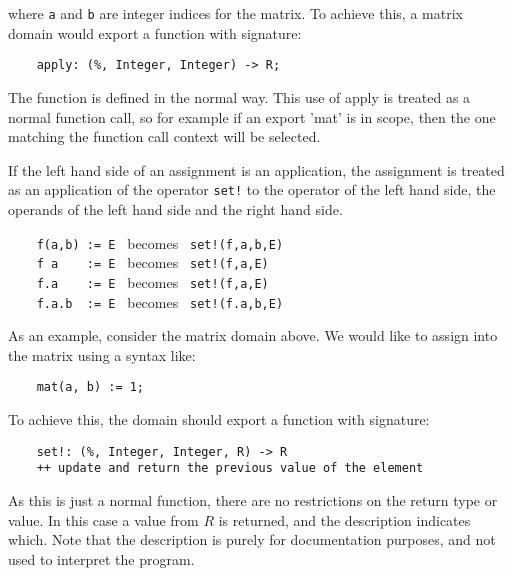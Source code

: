 where {\tt a} and {\tt b} are integer indices for the matrix. To
achieve this, a matrix domain would export a function with signature:

\begin{small}\begin{verbatim}
    apply: (%, Integer, Integer) -> R;
\end{verbatim}
\end{small}

The function is defined in the normal way.  This use of apply is
treated as a normal function call, so for example if an export 'mat'
is in scope, then the one matching the function call context will be selected.


If the left hand side of an assignment is an application, the
assignment is treated as an application of the operator {\tt set!}  to
the operator of the left hand side, the operands of the left hand side
and the right hand side.

\verb^    f(a,b) := E ^ becomes \verb^ set!(f,a,b,E)^ \\
\verb^    f a    := E ^ becomes \verb^ set!(f,a,E)^   \\
\verb^    f.a    := E ^ becomes \verb^ set!(f,a,E)^   \\
\verb^    f.a.b  := E ^ becomes \verb^ set!(f.a,b,E)^

As an example, consider the matrix domain above. We would like to assign
into the matrix using a syntax like:

\begin{small}\begin{verbatim}
	mat(a, b) := 1;
\end{verbatim}
\end{small}

To achieve this, the domain should export a function with signature:

\begin{small}\begin{verbatim}
    set!: (%, Integer, Integer, R) -> R
    ++ update and return the previous value of the element
\end{verbatim}
\end{small}

As this is just a normal function, there are no restrictions on the
return type or value. In this case a value from $R$ is returned, and
the description indicates which. Note that the description is purely
for documentation purposes, and not used to interpret the program.

